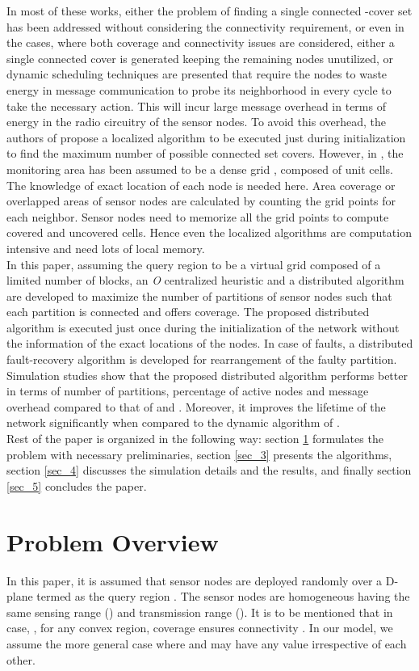 \documentclass{acm_proc_article-sp}
\begin{document}
In most of these works, either the problem of finding a single connected -cover set has been addressed without considering the connectivity requirement, or even in the cases, where both coverage and connectivity 
issues are considered, either a single connected cover is generated keeping the remaining nodes unutilized, or dynamic scheduling techniques are presented that require the nodes to waste energy in message communication to probe its neighborhood in every cycle to take the necessary action. This will incur large message overhead in terms of energy in the radio circuitry of the sensor nodes. To avoid this overhead, the authors of \cite{Pervin} propose a localized algorithm to be executed just during initialization to find the maximum number of possible connected set covers. However, in \cite{Gallais,Pervin,Tian}, the monitoring area has been assumed to be a dense grid \cite{Wei}, \cite{RSS} composed of unit cells. The knowledge of exact location of each node is needed here. Area 
coverage or overlapped areas of sensor nodes are calculated by counting the grid points for each neighbor. Sensor nodes need to memorize all the grid points to compute covered and uncovered cells. Hence even the localized algorithms are computation intensive and need lots of local memory.\\
In this paper, assuming the query region to be a virtual grid composed of a limited number of blocks, an {\it O} centralized heuristic and a distributed algorithm are developed to maximize the number of partitions of sensor nodes such that each partition is connected and offers  coverage. The proposed distributed algorithm is executed just once during the initialization of the network without the information of the exact locations of the nodes. In case of faults, a distributed fault-recovery algorithm is developed for rearrangement of the faulty partition. Simulation studies show that the proposed distributed algorithm performs better in terms of number of partitions, percentage of active nodes and message overhead compared to that of \cite{Gallais} and \cite{Pervin}. Moreover, it improves the lifetime of the network significantly when compared to the dynamic algorithm of \cite{Gallais}.\\
Rest of the paper is organized in the following way: section \ref{sec_2} formulates the problem with necessary preliminaries, section \ref{sec_3} presents the algorithms, section \ref{sec_4} discusses the simulation details and the results, and finally section \ref{sec_5} concludes the paper.
\section{{ Problem Overview}}
\label{sec_2}
 In this paper, it is assumed that  sensor nodes are deployed randomly over a D-plane termed as the query region . The sensor nodes are homogeneous having the same sensing range () and transmission range (). It is to be mentioned that in case, , for any convex region, coverage ensures connectivity \cite{Wang}. In our model, we assume the more general case where  and  may have any value irrespective of each other.
\end{document}
